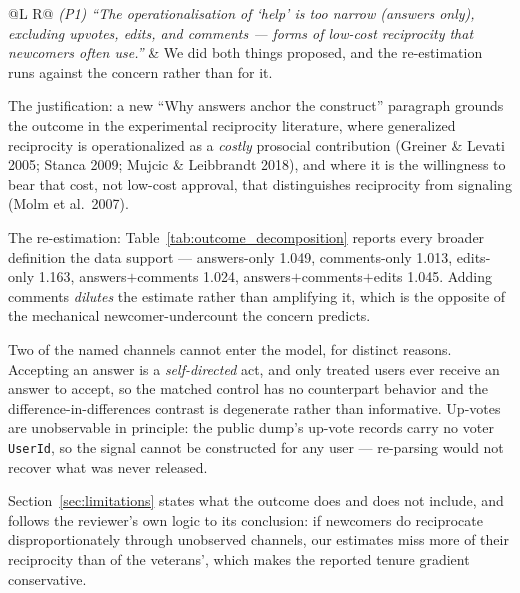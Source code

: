 \documentclass[11pt]{article}
\begin{document}
\begin{longtable}{@{}L R@{}}
\textit{(P1) ``The operationalisation of `help' is too narrow (answers only), excluding upvotes, edits, and comments --- forms of low-cost reciprocity that newcomers often use.''} &
We did both things proposed, and the re-estimation runs against the concern rather than for it.

The justification: a new ``Why answers anchor the construct'' paragraph grounds the outcome in the experimental reciprocity literature, where generalized reciprocity is operationalized as a \emph{costly} prosocial contribution (Greiner \& Levati 2005; Stanca 2009; Mujcic \& Leibbrandt 2018), and where it is the willingness to bear that cost, not low-cost approval, that distinguishes reciprocity from signaling (Molm et al.\ 2007).

The re-estimation: Table~\ref{tab:outcome_decomposition} reports every broader definition the data support --- answers-only 1.049, comments-only 1.013, edits-only 1.163, answers$+$comments 1.024, answers$+$comments$+$edits 1.045. Adding comments \emph{dilutes} the estimate rather than amplifying it, which is the opposite of the mechanical newcomer-undercount the concern predicts.

Two of the named channels cannot enter the model, for distinct reasons. Accepting an answer is a \emph{self-directed} act, and only treated users ever receive an answer to accept, so the matched control has no counterpart behavior and the difference-in-differences contrast is degenerate rather than informative. Up-votes are unobservable in principle: the public dump's up-vote records carry no voter \texttt{UserId}, so the signal cannot be constructed for any user --- re-parsing would not recover what was never released.

Section~\ref{sec:limitations} states what the outcome does and does not include, and follows the reviewer's own logic to its conclusion: if newcomers do reciprocate disproportionately through unobserved channels, our estimates miss more of their reciprocity than of the veterans', which makes the reported tenure gradient conservative. \\
\midrule


\end{longtable}
\end{document}
